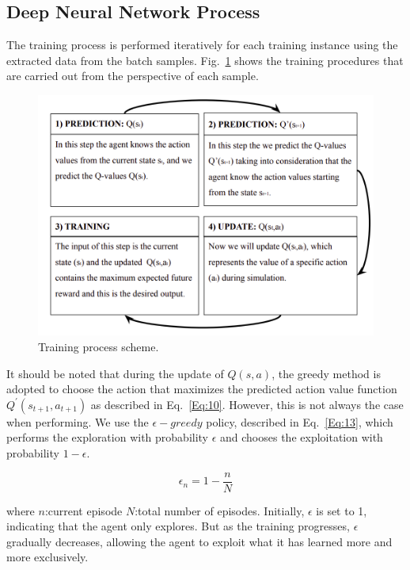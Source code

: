 \documentclass[conference]{IEEEtran}
\begin{document}
\subsection{Deep Neural Network Process}
The training process is performed iteratively for each training instance using the extracted data from the batch samples. Fig.~\ref{fig:8} shows the training procedures that are carried out from the perspective of each sample.

\begin{figure}[!ht]
    \centering
    \begin{center}
    \includegraphics[scale=0.25]{images/Training_Process.png}
    \end{center}
    \caption{Training process scheme.}
    \label{fig:8}
\end{figure}

It should be noted that during the update of $Q(s, a)$, the greedy method is adopted to choose the action that maximizes the predicted action value function $Q^{\prime}(s_{t+1},a_{t+1})$ as described in Eq.~\ref{Eq:10}. However, this is not always the case when performing. We use the $\epsilon-greedy$ policy, described in Eq.~\ref{Eq:13}, which performs the exploration with probability $\epsilon$ and chooses the exploitation with probability $1-\epsilon$. 

\begin{equation}\label{Eq:13}
    \epsilon_{n} = 1 - \frac{n}{N}
\end{equation}

where $n$:current episode $N$:total number of episodes. Initially, $\epsilon$ is set to 1, indicating that the agent only explores. But as the training progresses, $\epsilon$ gradually decreases, allowing the agent to exploit what it has learned more and more exclusively. 
\end{document}
